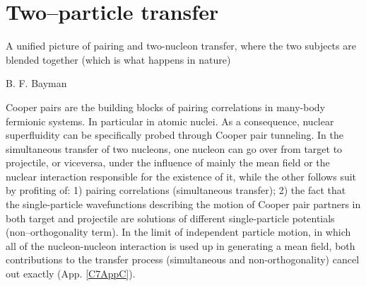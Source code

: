 
 \chapter{Two--particle transfer}\label{C7}
  \epigraph{A unified picture of pairing and two-nucleon transfer, where the two subjects are blended together (which is what happens in nature) }{B. F.  Bayman}
Cooper pairs are the building blocks of pairing correlations in many-body fermionic systems. In particular in atomic nuclei. As a consequence, nuclear superfluidity can be specifically probed through Cooper pair tunneling.
In the simultaneous transfer of two nucleons, one nucleon can go over from target to projectile, or viceversa, under the influence of mainly the mean field or the nuclear interaction
responsible for the existence of it,  while the other follows suit by profiting of: 1) pairing correlations (simultaneous transfer); 
2) the fact that the single-particle wavefunctions describing the motion of Cooper pair partners in both target and projectile are solutions of different 
single-particle potentials (non--orthogonality term). 
In the limit of independent particle motion, in which all of the nucleon-nucleon interaction is used up in generating a mean field, both contributions
to the transfer process (simultaneous and non-orthogonality) cancel out exactly (App. \ref{C7AppC}).

